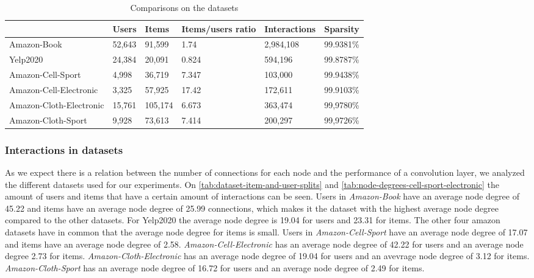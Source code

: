 \begin{table*}[]
    \centering
    \begin{tabular}{|l|l|l|l|l|l|}
        \hline
                                & Users  & Items   & Items/users ratio & Interactions & Sparsity  \\ \hline
        Amazon-Book             & 52,643 & 91,599  & 1.74              & 2,984,108    & 99.9381\% \\ \hline
        Yelp2020                & 24,384 & 20,091  & 0.824             & 594,196      & 99.8787\% \\ \hline
        Amazon-Cell-Sport       & 4,998  & 36,719  & 7.347             & 103,000      & 99.9438\% \\ \hline
        Amazon-Cell-Electronic  & 3,325  & 57,925  & 17.42             & 172,611      & 99.9103\% \\ \hline
        Amazon-Cloth-Electronic & 15,761 & 105,174 & 6.673             & 363,474      & 99,9780\% \\ \hline
        Amazon-Cloth-Sport      & 9,928  & 73,613  & 7.414             & 200,297      & 99,9726\% \\ \hline
    \end{tabular}
    \caption{Comparisons on the datasets}
    \label{tab:dataset-comparison}
\end{table*}

\subsubsection{Interactions in datasets}
As we expect there is a relation between the number of connections for each node and the performance of a convolution layer, we analyzed the different datasets used for our experiments.
On \autoref{tab:dataset-item-and-user-splits} and \autoref{tab:node-degrees-cell-sport-electronic} the amount of users and items that have a certain amount of interactions can be seen.
Users in \textit{Amazon-Book} have an average node degree of 45.22 and items have an average node degree of 25.99 connections, which makes it the dataset with the highest average node degree compared to the other datasets.
For Yelp2020 the average node degree is 19.04 for users and 23.31 for items.
The other four amazon datasets have in common that the average node degree for items is small.
Users in \textit{Amazon-Cell-Sport} have an average node degree of 17.07 and items have an average node degree of 2.58.
\textit{Amazon-Cell-Electronic} has an average node degree of 42.22 for users and an average node degree 2.73 for items.
\textit{Amazon-Cloth-Electronic} has an average node degree of 19.04 for users and an avevrage node degree of 3.12 for items.
\textit{Amazon-Cloth-Sport} has an average node degree of 16.72 for users and an average node degree of 2.49 for items.

